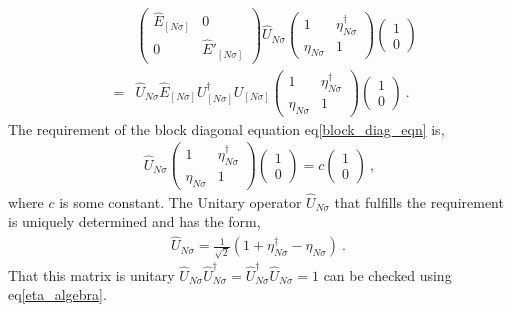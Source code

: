 \documentclass[12pt,a4paper]{article}
\begin{document}
\begin{eqnarray}
&&\begin{pmatrix}
			\hat{E}_{[N\sigma]}							 & 0\\
				0					& \hat{E}'_{[N\sigma]}
											\end{pmatrix}\hat{U}_{N\sigma}\begin{pmatrix}
											1 & \eta^{\dagger}_{N\sigma}\\
											\eta_{N\sigma} & 1
											\end{pmatrix}\begin{pmatrix}
											1 \\ 0
											\end{pmatrix}\nonumber\\
											&=&\hat{U}_{N\sigma}\hat{E}_{[N\sigma]}U^{\dagger}_{[N\sigma]}U_{[N\sigma]}\begin{pmatrix}
											1 & \eta^{\dagger}_{N\sigma}\\
											\eta_{N\sigma} & 1
											\end{pmatrix}\begin{pmatrix}
											1 \\ 0
											\end{pmatrix}~.
\end{eqnarray} 
The requirement of the block diagonal equation eq\eqref{block_diag_eqn} is,
\begin{eqnarray}
\hat{U}_{N\sigma}\begin{pmatrix}
											1 & \eta^{\dagger}_{N\sigma}\\
											\eta_{N\sigma} & 1
											\end{pmatrix}\begin{pmatrix}
											1 \\ 0
											\end{pmatrix} = c\begin{pmatrix}
											1 \\ 0
											\end{pmatrix}~,\label{BD_req}
\end{eqnarray}
where $c$ is some constant.
The Unitary operator $\hat{U}_{N\sigma}$ that fulfills the requirement is uniquely determined and has the form,
\begin{eqnarray}
\hat{U}_{N\sigma} = \frac{1}{\sqrt{2}}(1+\eta^{\dagger}_{N\sigma}-\eta_{N\sigma})~.~
\end{eqnarray}
That this matrix is unitary $\hat{U}_{N\sigma}\hat{U}^{\dagger}_{N\sigma}= \hat{U}^{\dagger}_{N\sigma}\hat{U}_{N\sigma} =1$ can be checked using eq\eqref{eta_algebra}.
\end{document}
